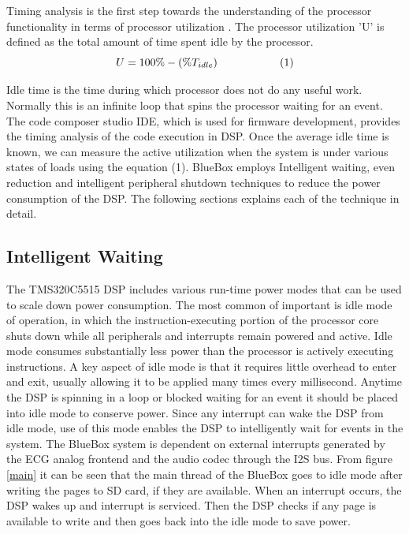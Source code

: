  \hspace{10mm}Timing analysis is the first step towards the understanding of the processor functionality in terms of processor utilization \cite{sastra}. The processor utilization 'U' is defined as the total amount of time spent idle by the processor. 
\[ U = 100\% - (\% T_{idle}) \hspace{20mm} (1)\]

 \hspace{10mm}Idle time is the time during which processor does not do any useful work. Normally this is an infinite loop that spins the processor waiting for an event. The code composer studio IDE, which is used for firmware development, provides the timing analysis of the code execution in DSP. Once the average idle time is known, we can measure the active utilization when the system is under various states of loads using the equation (1). BlueBox employs Intelligent waiting, even reduction and intelligent peripheral shutdown techniques to reduce the power consumption of the DSP. The following sections explains each of the technique in detail. 

\subsection{Intelligent Waiting}
The TMS320C5515 DSP includes various run-time power modes that can be used to scale down power consumption. The most common of important is idle mode of operation, in which the instruction-executing portion of the processor core shuts down while all peripherals and interrupts remain powered and active. Idle mode consumes substantially less power than the processor is actively executing instructions. A key aspect of idle mode is that it requires little overhead to enter and exit, usually allowing it to be applied many times every millisecond. Anytime the DSP is spinning in a loop or blocked waiting for an event it should be placed into idle mode to conserve power. Since any interrupt can wake the DSP from idle mode, use of this mode enables the DSP to intelligently wait for events in the system. The BlueBox system is dependent on external interrupts generated by the ECG analog frontend and the audio codec through the I2S bus. From figure \ref{main} it can be seen that the main thread of the BlueBox goes to idle mode after writing the pages to SD card, if they are available. When an interrupt occurs, the DSP wakes up and interrupt is serviced. Then the DSP checks if any page is available to write and then goes back into the idle mode to save power. 


